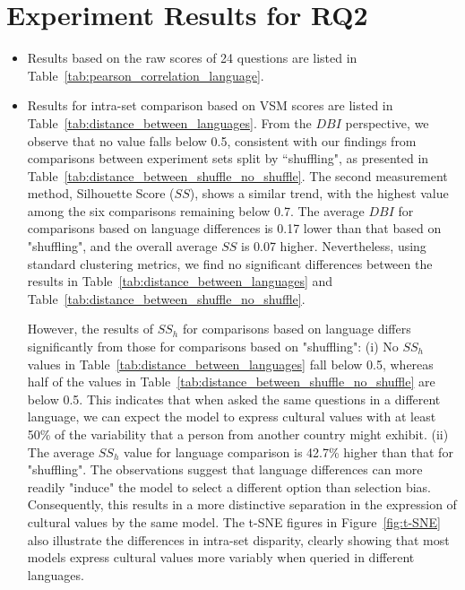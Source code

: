 \documentclass[11pt]{article}
\begin{document}
\section{Experiment Results for RQ2}
\label{appendix:RQ2_results}
\begin{itemize}
    \item Results based on the raw scores of 24 questions are listed in Table~\ref{tab:pearson_correlation_language}.
    \item Results for intra-set comparison based on VSM scores are listed in Table~\ref{tab:distance_between_languages}. From the $DBI$ perspective, we observe that no value falls below 0.5, consistent with our findings from comparisons between experiment sets split by ``shuffling", as presented in Table~\ref{tab:distance_between_shuffle_no_shuffle}. The second measurement method, Silhouette Score ($SS$), shows a similar trend, with the highest value among the six comparisons remaining below 0.7. The average $DBI$ for comparisons based on language differences is 0.17 lower than that based on "shuffling", and the overall average $SS$ is 0.07 higher. Nevertheless, using standard clustering metrics, we find no significant differences between the results in Table~\ref{tab:distance_between_languages} and Table~\ref{tab:distance_between_shuffle_no_shuffle}.

    However, the results of $SS_h$ for comparisons based on language differs significantly from those for comparisons based on "shuffling": (i) No $SS_h$ values in Table~\ref{tab:distance_between_languages} fall below 0.5, whereas half of the values in Table~\ref{tab:distance_between_shuffle_no_shuffle} are below 0.5. This indicates that when asked the same questions in a different language, we can expect the model to express cultural values with at least 50\% of the variability that a person from another country might exhibit. (ii) The average $SS_h$ value for language comparison is 42.7\% higher than that for "shuffling". The observations suggest that language differences can more readily "induce" the model to select a different option than selection bias. Consequently, this results in a more distinctive separation in the expression of cultural values by the same model. The t-SNE figures in Figure~\ref{fig:t-SNE} also illustrate the differences in intra-set disparity, clearly showing that most models express cultural values more variably when queried in different languages.
\end{itemize}
\end{document}
